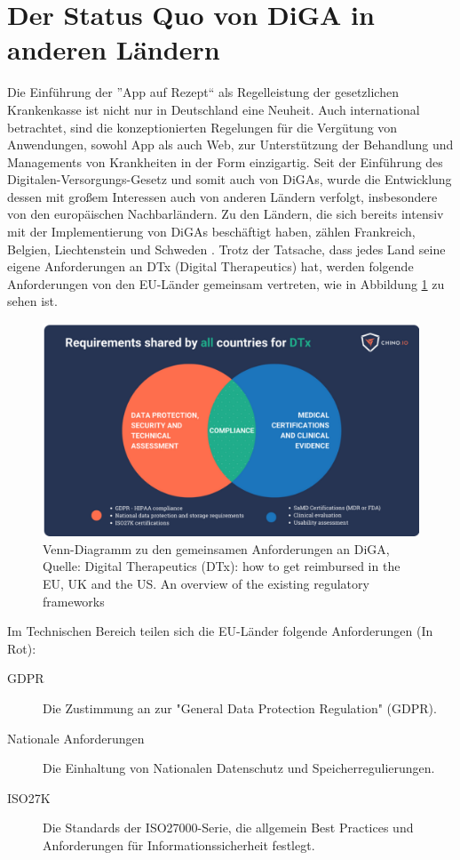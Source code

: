 \documentclass{article}
\begin{document}
	\section{Der Status Quo von DiGA in anderen Ländern}
		Die Einführung der ''App auf Rezept`` als Regelleistung der gesetzlichen Krankenkasse ist nicht nur in Deutschland eine Neuheit. Auch international betrachtet, sind die konzeptionierten Regelungen für die Vergütung von Anwendungen, sowohl App als auch Web, zur Unterstützung der Behandlung und Managements von Krankheiten in der Form einzigartig. Seit der Einführung des Digitalen-Versorgungs-Gesetz und somit auch von DiGAs, wurde die Entwicklung dessen mit großem Interessen auch von anderen Ländern verfolgt, insbesondere von den europäischen Nachbarländern. Zu den Ländern, die sich bereits intensiv mit der Implementierung von DiGAs beschäftigt haben, zählen Frankreich, Belgien, Liechtenstein und Schweden \cite[vgl. S.25-26]{TK-diga-report-1}. Trotz der Tatsache, dass jedes Land seine eigene Anforderungen an DTx (Digital Therapeutics) hat, werden folgende Anforderungen von den EU-Länder gemeinsam vertreten, wie in Abbildung \ref{Abb-venn-diagramm} zu sehen ist. 
		\begin{figure}
			\centering
			\includegraphics[width=\textwidth]{./grafiken/venn_diagramm_anforderungen}
			\caption[Abbildung zu geteilten Anforderungen]{Venn-Diagramm zu den gemeinsamen Anforderungen an DiGA, Quelle: Digital Therapeutics (DTx): how to get reimbursed in the EU, UK and the US. An overview of the existing regulatory frameworks \cite{dtx-regulatory-frameworks}}
			\label{Abb-venn-diagramm}
		\end{figure}
		\newpage 
		Im Technischen Bereich teilen sich die EU-Länder folgende Anforderungen (In Rot):
		\begin{description}
			\item[GDPR] Die Zustimmung an zur "General Data Protection Regulation" (GDPR).
			\item[Nationale Anforderungen] Die Einhaltung von Nationalen Datenschutz und Speicherregulierungen.
			\item[ISO27K] Die Standards der ISO27000-Serie, die allgemein Best Practices und Anforderungen für Informationssicherheit festlegt.   
		\end{description}
\end{document}
